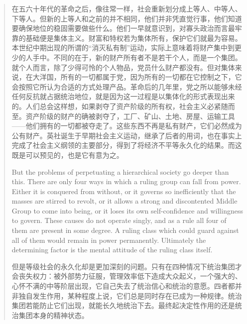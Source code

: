 \begin{paracol}{2}
\begin{quotation}
\switchcolumn

在五六十年代的革命之后，像往常一样，社会重新划分成上等人、中等人、下等人。但新的上等人和之前的并不相同，他们并非凭直觉行事，他们知道要确保地位的稳固需要做些什么。他们一早就意识到，对寡头政治而言最牢靠的基础便是集体主义。财富和特权若为集体所有，保护它们就最为容易。本世纪中期出现的所谓的``消灭私有制''运动，实际上意味着将财产集中到更少的人手中。不同的在于，新的财产所有者不是若干个人，而是一个集团。就个人而言，除了少得可怜的个人物品，党员什么财产都没有。但对集体来说，在大洋国，所有的一切都属于党，因为所有的一切都在它控制之下，它会按照它所认为合适的方式处理产品。革命后的几年里，党之所以能够未经任何反抗就占据统治地位，就是因为这一过程是以集体化的形式表现出来的。人们总会这样想，如果剥夺了资产阶级的所有权，社会主义必紧随而至。资产阶级的财产的确被剥夺了，工厂、矿山、土地、房屋、运输工具——他们拥有的一切都被夺走了。这些东西不再是私有财产，它们必然成为公有财产。英社诞生于早期社会主义运动，继承了后者的用词，也在事实上完成了社会主义纲领的主要部分，得到了将经济不平等永久化的结果。而这既是可以预见的，也是它有意为之。

\switchcolumn*

But the problems of perpetuating a hierarchical society go deeper than
this. There are only four ways in which a ruling group can fall from
power. Either it is conquered from without, or it governs so
inefficiently that the masses are stirred to revolt, or it allows a
strong and discontented Middle Group to come into being, or it loses its
own self-confidence and willingness to govern. These causes do not
operate singly, and as a rule all four of them are present in some
degree. A ruling class which could guard against all of them would
remain in power permanently. Ultimately the determining factor is the
mental attitude of the ruling class itself.

\switchcolumn

但是等级社会的永久化却是更加深刻的问题。只有在四种情况下统治集团才会丧失权力：被外部势力征服，管理效率低下造成大众起义，一个强大的、心怀不满的中等阶层出现，它自己失去了统治信心和统治的意愿。四者都并非独自发生作用，某种程度上说，它们总是同时存在已成为一种规律。统治集团若能防止它们出现，就能长久地统治下去。最终起决定性作用的还是统治集团本身的精神状态。

\switchcolumn*


\end{quotation}
\end{paracol}
